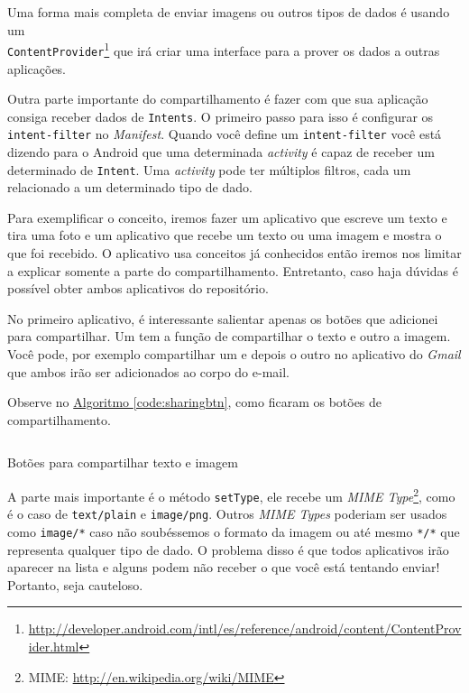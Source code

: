 \documentclass[a4paper,12pt,brazil,oneside]{book}
\begin{document}
\begin{singlespace}
		Uma forma mais completa de enviar imagens ou outros tipos de dados é usando um \\ \texttt{ContentProvider}\footnote{\href{http://developer.android.com/intl/es/reference/android/content/ContentProvider.html}{http://developer.android.com/intl/es/reference/android/content/ContentProvider.html}} que irá criar uma interface para a prover os dados a outras aplicações.

		Outra parte importante do compartilhamento é fazer com que sua aplicação consiga receber dados de \texttt{Intents}. O primeiro passo para isso é configurar os \texttt{intent-filter} no \emph{Manifest}. Quando você define um \texttt{intent-filter} você está dizendo para o Android que uma determinada \emph{activity} é capaz de receber um determinado de \texttt{Intent}. Uma \emph{activity} pode ter múltiplos filtros, cada um relacionado a um determinado tipo de dado.

		Para exemplificar o conceito, iremos fazer um aplicativo que escreve um texto e tira uma foto e um aplicativo que recebe um texto ou uma imagem e mostra o que foi recebido. O aplicativo usa conceitos já conhecidos então iremos nos limitar a explicar somente a parte do compartilhamento. Entretanto, caso haja dúvidas é possível obter ambos aplicativos do repositório.

		No primeiro aplicativo, é interessante salientar apenas os botões que adicionei para compartilhar. Um tem a função de compartilhar o texto e outro a imagem. Você pode, por exemplo compartilhar um e depois o outro no aplicativo do \emph{Gmail} que ambos irão ser adicionados ao corpo do e-mail.
		
		Observe no \hyperref[code:sharingbtn]{Algoritmo \ref*{code:sharingbtn}}, como ficaram os botões de compartilhamento.

		\begin{listing}[H]
		\inputminted[linenos=true,fontsize=\small,frame=lines, framesep=2mm, tabsize=2,numbersep=5pt]{java}{src/api/sharing/sharingbtn.java}
		\caption{Botões para compartilhar texto e imagem}
		\label{code:sharingbtn}
		\end{listing} 		

		A parte mais importante é o método \texttt{setType}, ele recebe um \emph{MIME Type}\footnote{MIME: \href{http://en.wikipedia.org/wiki/MIME}{http://en.wikipedia.org/wiki/MIME}}, como é o caso de \texttt{text/plain} e \texttt{image/png}. Outros \emph{MIME Types} poderiam ser usados como \texttt{image/*} caso não soubéssemos o formato da imagem ou até mesmo \texttt{*/*} que representa qualquer tipo de dado. O problema disso é que todos aplicativos irão aparecer na lista e alguns podem não receber o que você está tentando enviar! Portanto, seja cauteloso.


\end{singlespace}
\end{document}
